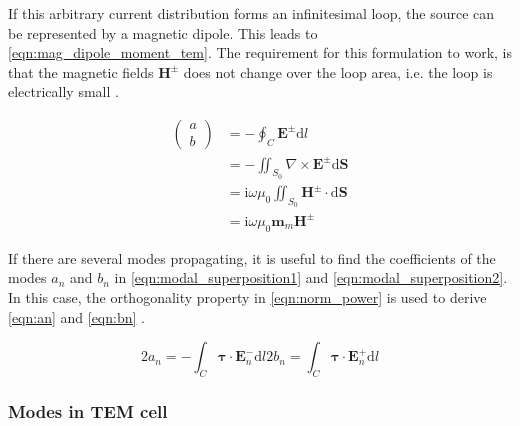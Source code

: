 If this arbitrary current distribution forms an infinitesimal loop, the source can be represented by a magnetic dipole. This leads to \autoref{eqn:mag_dipole_moment_tem}. The requirement for this formulation to work, is that the magnetic fields $\mathbf{H}^\pm$ does not change over the loop area, i.e. the loop is electrically small \cite{Collin_2015,Sreenivasiah_Chang_Ma_1981}.

\begin{align}
    \begin{pmatrix}a \\b\end{pmatrix} &= -\oint_C \mathbf{E}^\pm \mathrm{d}l \\
    &= -\iint_{S_0} \nabla \times \mathbf{E}^\pm \mathrm{d}\mathbf{S}\\
    &= \mathrm{i}\omega\mu_0\iint_{S_0} \mathbf{H}^\pm\cdot \mathrm{d}\mathbf{S}\\
    &= \mathrm{i}\omega\mu_0\mathbf{m}_m\mathbf{H}^\pm 
    \label{eqn:mag_dipole_moment_tem}
\end{align}


If there are several modes propagating, it is useful to find the coefficients of the modes $a_n$ and $b_n$ in \autoref{eqn:modal_superposition1} and \autoref{eqn:modal_superposition2}. In this case, the orthogonality property in \autoref{eqn:norm_power} is used to derive \autoref{eqn:an} and \autoref{eqn:bn} \cite{Collin_2015}.

\begin{subequations}
    \begin{equation}
        2a_n = -\int_C \mathbf{\tau}\cdot\mathbf{E}_n^-\mathrm{d}l
        \label{eqn:an}
    \end{equation}
        \begin{equation}
        2b_n = \int_C \mathbf{\tau}\cdot\mathbf{E}_n^+\mathrm{d}l
        \label{eqn:bn}
    \end{equation}
\end{subequations}

\subsubsection{Modes in TEM cell}


